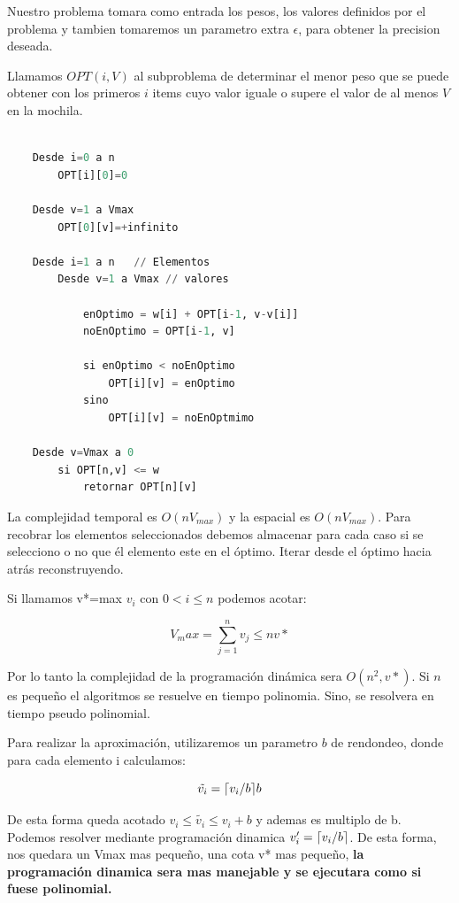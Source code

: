 \documentclass{article}
\DeclarePairedDelimiter{\ceil}{\lceil}{\rceil}
\begin{document}
Nuestro problema tomara como entrada los pesos, los valores definidos por el problema y tambien
tomaremos un parametro extra \(\epsilon\), para obtener la precision deseada.

Llamamos \(OPT(i,V)\) al subproblema de determinar el menor peso que se puede obtener con los primeros
\(i\) items cuyo valor iguale o supere el valor de al menos \(V\) en la mochila.

\begin{lstlisting}[language=Python, caption=Algoritmo de aproximación con programación dinamica usando interativo]
    
    Desde i=0 a n
        OPT[i][0]=0
    
    Desde v=1 a Vmax
        OPT[0][v]=+infinito

    Desde i=1 a n   // Elementos
        Desde v=1 a Vmax // valores 
    
            enOptimo = w[i] + OPT[i-1, v-v[i]]
            noEnOptimo = OPT[i-1, v]

            si enOptimo < noEnOptimo
                OPT[i][v] = enOptimo
            sino
                OPT[i][v] = noEnOptmimo
    
    Desde v=Vmax a 0
        si OPT[n,v] <= w
            retornar OPT[n][v]


\end{lstlisting}   

La complejidad temporal es \(O(nV_{max})\) y la espacial es \(O(nV_{max})\). Para recobrar los elementos seleccionados
debemos almacenar para cada caso si se selecciono o no que él elemento este en el óptimo. Iterar desde el óptimo hacia
atrás reconstruyendo.

Si llamamos v*=max {\(v_i\)} con \(0 < i \leq n\) podemos acotar:

\[
    V_max = \sum_{j=1}^{n}v_j \leq nv*
\]

Por lo tanto la complejidad de la programación dinámica sera \(O(n^2, v*)\). Si \(n\) es pequeño
el algoritmos se resuelve en tiempo polinomia. Sino, se resolvera en tiempo pseudo polinomial.

Para realizar la aproximación, utilizaremos un parametro \(b\) de rendondeo, 
donde para cada elemento i calculamos:

\[
     \tilde{v_i} = \ceil{v_i/b}b
\]

De esta forma queda acotado \(v_i \leq \tilde{v_i} \leq v_i + b\) y ademas es multiplo de b.
Podemos resolver mediante programación dinamica \(v'_i = \ceil{v_i/b}\). De esta forma,
nos quedara un Vmax mas pequeño, una cota v* mas pequeño, \textbf{la programación dinamica sera 
mas manejable y se ejecutara como si fuese polinomial.}
\end{document}
